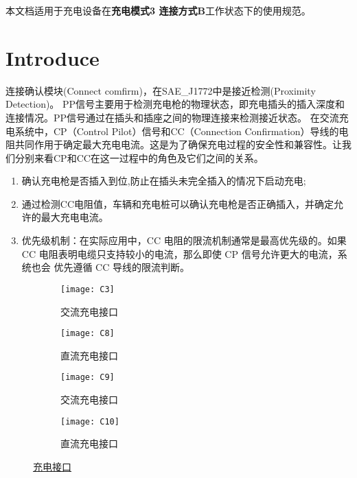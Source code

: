 本文档适用于充电设备在{\bf 充电模式3 连接方式B}工作状态下的使用规范。

\section{Introduce}
    连接确认模块(Connect comfirm)，在SAE\_J1772中是接近检测(Proximity Detection)\cite{SAE}。 
    PP信号主要用于检测充电枪的物理状态，即充电插头的插入深度和连接情况。PP信号通过在插头和插座之间的物理连接来检测接近状态。
    在交流充电系统中，CP（Control Pilot）信号和CC（Connection Confirmation）导线的电阻共同作用于确定最大充电电流。这是为了确保充电过程的安全性和兼容性。让我们分别来看CP和CC在这一过程中的角色及它们之间的关系。

 \begin{enumerate}
    \item  确认充电枪是否插入到位,防止在插头未完全插入的情况下启动充电;
    \item  通过检测CC电阻值，车辆和充电桩可以确认充电枪是否正确插入，并确定允许的最大充电电流。
    \item 优先级机制：在实际应用中，CC 电阻的限流机制通常是最高优先级的。如果 CC
    电阻表明电缆只支持较小的电流，那么即使 CP 信号允许更大的电流，系统也会
    优先遵循 CC 导线的限流判断。
 \end{enumerate}


\begin{figure}[!htbp]
    \centering
    \begin{subfigure}[b]{0.45\textwidth}
        \centering
        \texttt{[image: C3]} 
        \caption{交流充电接口}
        \label{fig:C3}
    \end{subfigure}
    \hspace*{-0.6cm}
    \begin{subfigure}[b]{0.45\textwidth}
        \centering
        \texttt{[image: C8]} 
        \caption{直流充电接口}
        \label{fig:C8}
    \end{subfigure}
    \begin{subfigure}[b]{0.45\textwidth}
        \centering
        \texttt{[image: C9]} 
        \caption{交流充电接口\cite{GB20234_2}}
        \label{fig:C9}
    \end{subfigure}
    \hspace*{-0.6cm}
    \begin{subfigure}[b]{0.45\textwidth}
        \centering
        \texttt{[image: C10]} 
        \caption{直流充电接口\cite{GB20234_3}}
        \label{fig:C10}
    \end{subfigure}
    \caption{\href{https://www.chooseauto.com.cn/news/89436.shtml}{充电接口}}
    \label{fig:main}
\end{figure}



